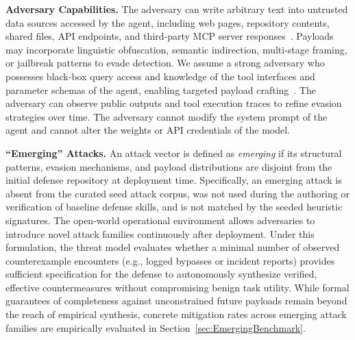 \noindent
\textbf{Adversary Capabilities.} The adversary can write arbitrary
text into untrusted data sources accessed by the agent, including web
pages, repository contents, shared files, API endpoints, and
third-party MCP server
responses~\cite{greshake,liu-injection,tensortrust}. Payloads may
incorporate linguistic obfuscation, semantic indirection, multi-stage
framing, or jailbreak patterns to evade detection. We assume a strong
adversary who possesses black-box query access and knowledge of the
tool interfaces and parameter schemas of the agent, enabling targeted
payload crafting~\cite{agentdojo,injecagent}. The adversary can observe
public outputs and tool execution traces to refine evasion strategies
over time. The adversary cannot modify the system prompt
of the agent and cannot alter the weights or API credentials of the model.

\noindent
\textbf{``Emerging'' Attacks.} An attack vector is defined as \emph{emerging} if
its structural patterns, evasion mechanisms, and payload distributions
are disjoint from the initial defense repository at deployment
time. Specifically, an emerging attack is absent from the curated seed
attack corpus, was not used during the authoring or verification of
baseline defense skills, and is not matched by the seeded heuristic
signatures. The open-world operational environment allows adversaries
to introduce novel attack families continuously after
deployment. Under this formulation, the threat model evaluates whether
a minimal number of observed counterexample encounters (e.g., logged
bypasses or incident reports) provides sufficient specification for
the defense to autonomously synthesize verified, effective
countermeasures without compromising benign task utility.
While formal guarantees of completeness against unconstrained future
payloads remain beyond the reach of empirical synthesis, concrete
mitigation rates across emerging attack families are empirically
evaluated in Section~\ref{sec:EmergingBenchmark}.
